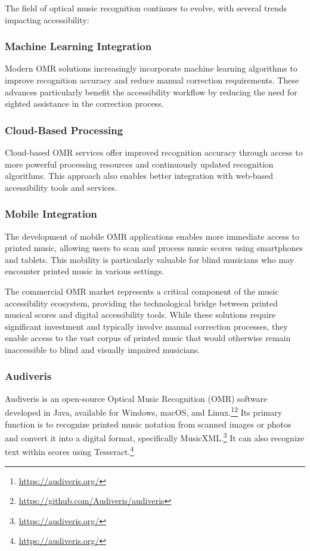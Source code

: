The field of optical music recognition continues to evolve, with several trends impacting accessibility:

\subsubsection{Machine Learning Integration}
Modern OMR solutions increasingly incorporate machine learning algorithms to improve recognition accuracy and reduce manual correction requirements. These advances particularly benefit the accessibility workflow by reducing the need for sighted assistance in the correction process.

\subsubsection{Cloud-Based Processing}
Cloud-based OMR services offer improved recognition accuracy through access to more powerful processing resources and continuously updated recognition algorithms. This approach also enables better integration with web-based accessibility tools and services.

\subsubsection{Mobile Integration}
The development of mobile OMR applications enables more immediate access to printed music, allowing users to scan and process music scores using smartphones and tablets. This mobility is particularly valuable for blind musicians who may encounter printed music in various settings.

The commercial OMR market represents a critical component of the music accessibility ecosystem, providing the technological bridge between printed musical scores and digital accessibility tools. While these solutions require significant investment and typically involve manual correction processes, they enable access to the vast corpus of printed music that would otherwise remain inaccessible to blind and visually impaired musicians.
\subsubsection{Audiveris}
Audiveris is an open-source Optical Music Recognition (OMR) software developed in Java, available for Windows, macOS, and Linux.\footnote{\url{https://audiveris.org/}}\footnote{\url{https://github.com/Audiveris/audiveris}} Its primary function is to recognize printed music notation from scanned images or photos and convert it into a digital format, specifically MusicXML.\footnote{\url{https://audiveris.org/}} It can also recognize text within scores using Tesseract.\footnote{\url{https://audiveris.org/}}

